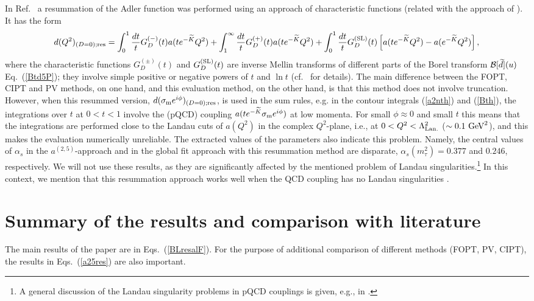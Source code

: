 \documentclass[aps,nofootinbib,showkeys,noshowpacs,preprintnumbers,amsmath,amssymb]{revtex4}
\def\be{\begin{equation}}
\def\ee{\end{equation}}
\newcommand{\sm}{{\sigma_{\rm m}}}
\newcommand{\tK}{{\widetilde K}}
\newcommand{\td}{{\widetilde d}}
\begin{document}
In Ref.~\cite{renmod} a resummation of the Adler function was performed using an approach of characteristic functions (related with the approach of \cite{Neubert}).  It has the form
\be
d(Q^2)_{(D=0); \rm res} = \int_0^1 \frac{dt}{t} G^{(-)}_D(t) a(t e^{-\tK} Q^2) +
\int_1^{\infty} \frac{dt}{t} G^{(+)}_D(t) a(t e^{-\tK} Q^2) + \int_0^1 \frac{dt}{t} G^{\rm (SL)}_D(t) \left[ a(t e^{-\tK} Q^2) - a(e^{-\tK} Q^2) \right],
\label{Dres2b}
\ee
where the characteristic functions $ G^{(\pm)}_D(t)$ and $G^{\rm (SL)}_D(t)$ are inverse Mellin transforms of different parts of the Borel transform ${\cal B}[\td](u)$ Eq.~(\ref{Btd5P}); they involve simple positive or negative powers of $t$ and $\ln t$ (cf.~\cite{renmod} for details). The main difference between the FOPT, CIPT and PV methods, on one hand, and this evaluation method, on the other hand, is that this method does not involve truncation. However, when this resummed version, $d(\sm e^{i \phi})_{(D=0); \rm res}$, is used in the sum rules, e.g. in the contour integrals (\ref{a2nth}) and (\ref{Bth}), the integrations over $t$ at $0<t<1$ involve the (pQCD) coupling $a(t e^{-\tK} \sm e^{i \phi})$ at low momenta. For small $\phi \approx 0$ and small $t$ this means that the integrations are performed close to the Landau cuts of $a(Q^2)$ in the complex $Q^2$-plane, i.e., at $0 < Q^2 < {\Lambda}^2_{\rm Lan.}$ ($\sim 0.1 \ {\rm GeV}^2$), and this makes the evaluation numerically unreliable. The extracted values of the parameters also indicate this problem. Namely, the central values of $\alpha_s$ in the $a^{(2,5)}$-approach and in the global fit approach with this resummation method are disparate, $\alpha_s(m_{\tau}^2) = 0.377$ and $0.246$, respectively. We will not use these results, as they are significantly affected by the mentioned problem of Landau singularities.\footnote{A general discussion of the Landau singularity problems in pQCD couplings is given, e.g., in \cite{LandauC}.} In this context, we mention that this resummation approach works well when the QCD coupling has no Landau singularities \cite{renmod}.


\section{Summary of the results and comparison with literature}
\label{sec:summ}

The main results of the paper are in Eqs.~(\ref{BLresalF}). For the purpose of additional comparison of different methods (FOPT, PV, CIPT), the results in Eqs.~(\ref{a25res}) are also important.
\end{document}
